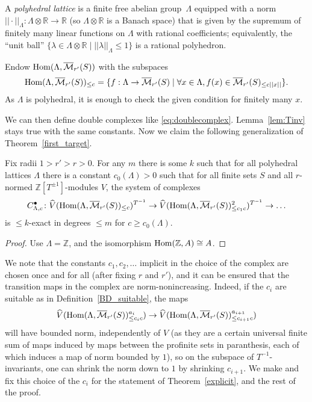 \begin{definition}
  \label{polyhedral_lattice}
  A \emph{polyhedral lattice} is a finite free abelian group~$\Lambda$
  equipped with a norm $||\cdot||_\Lambda \colon \Lambda\otimes \mathbb R\to \mathbb R$
  (so $\Lambda\otimes \mathbb R$ is a Banach space)
  that is given by the supremum of finitely many linear functions on $\Lambda$ with rational coefficients;
  equivalently, the ``unit ball''
  $\{\lambda\in \Lambda\otimes \mathbb R\mid ||\lambda||_\Lambda\leq 1\}$ is a rational polyhedron.
\end{definition}

Endow $\operatorname{Hom}(\Lambda,\overline{\mathcal M}_{r'}(S))$ with the subspaces
\[
\operatorname{Hom}(\Lambda,\overline{\mathcal M}_{r'}(S))_{\leq c} = \{f: \Lambda\to \overline{\mathcal M}_{r'}(S)\mid \forall x\in \Lambda, f(x)\in \overline{\mathcal M}_{r'}(S)_{\leq c||x||}\}.
\]
As $\Lambda$ is polyhedral, it is enough to check the given condition for finitely many $x$.

We can then define double complexes like \eqref{eq:doublecomplex}.
Lemma~\ref{lem:Tinv} stays true with the same constants.
Now we claim the following generalization of Theorem~\ref{first_target}.

\begin{theorem}
  \label{explicit}
  Fix radii $1>r'>r>0$. For any $m$ there is some $k$
  such that for all polyhedral lattices $\Lambda$
  there is a constant $c_0(\Lambda)>0$
  such that for all finite sets $S$
  and all $r$-normed $\mathbb Z[T^{\pm 1}]$-modules $V$,
  the system of complexes
  \[
  C_{\Lambda,c}^\bullet \colon
  \widehat{V}(\operatorname{Hom}(\Lambda,\overline{\mathcal M}_{r'}(S))_{\leq c})^{T^{-1}} \to
  \widehat{V}(\operatorname{Hom}(\Lambda,\overline{\mathcal M}_{r'}(S))_{\leq c_1c}^2)^{T^{-1}} \to \ldots
  \]
  is $\leq k$-exact in degrees $\leq m$ for $c\geq c_0(\Lambda)$.
\end{theorem}

\begin{proof}
  Use $\Lambda = \mathbb Z$, and the isomorphism $\operatorname{Hom}(\mathbb Z, A) \cong A$.
\end{proof}

We note that the constants $c_1,c_2,\ldots$ implicit in the choice of the complex
are chosen once and for all (after fixing $r$ and $r'$),
and it can be ensured that the transition maps in the complex are norm-nonincreasing.
Indeed, if the $c_i$ are suitable as in Definition~\ref{BD_suitable},
the maps
\[
\widehat{V}(\operatorname{Hom}(\Lambda,\overline{\mathcal M}_{r'}(S))_{\leq c_ic}^{a_i})\to \widehat{V}(\operatorname{Hom}(\Lambda,\overline{\mathcal M}_{r'}(S))_{\leq c_{i+1}c}^{a_{i+1}})
\]
will have bounded norm, independently of $V$ (as they are a certain universal finite sum of maps induced by maps between the profinite sets in paranthesis, each of which induces a map of norm bounded by $1$), so on the subspace of $T^{-1}$-invariants, one can shrink the norm down to $1$ by shrinking $c_{i+1}$. We make and fix this choice of the $c_i$ for the statement of Theorem~\ref{explicit}, and the rest of the proof.


